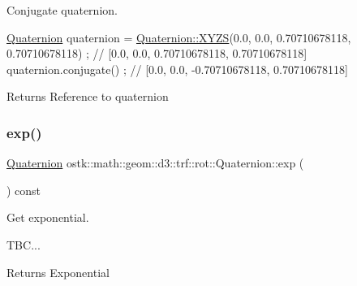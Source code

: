 Conjugate quaternion. 


\begin{DoxyCode}
\hyperlink{classostk_1_1math_1_1geom_1_1d3_1_1trf_1_1rot_1_1_quaternion_ad9fd7d8eb5effb4d4e0394bbb5bb86dc}{Quaternion} quaternion = \hyperlink{classostk_1_1math_1_1geom_1_1d3_1_1trf_1_1rot_1_1_quaternion_ac57ea57a4033622ed1389101b2e58c76}{Quaternion::XYZS}(0.0, 0.0, 0.70710678118, 0.70710678118) 
      ; \textcolor{comment}{// [0.0, 0.0, 0.70710678118, 0.70710678118]}
quaternion.conjugate() ; \textcolor{comment}{// [0.0, 0.0, -0.70710678118, 0.70710678118]}
\end{DoxyCode}


\begin{DoxyReturn}{Returns}
Reference to quaternion 
\end{DoxyReturn}
\mbox{\label{classostk_1_1math_1_1geom_1_1d3_1_1trf_1_1rot_1_1_quaternion_ab52abec08a04aa42646b2f418b7ba964}} 
\subsubsection{\texorpdfstring{exp()}{exp()}}
{\footnotesize\ttfamily \hyperlink{classostk_1_1math_1_1geom_1_1d3_1_1trf_1_1rot_1_1_quaternion}{Quaternion} ostk\+::math\+::geom\+::d3\+::trf\+::rot\+::\+Quaternion\+::exp (\begin{DoxyParamCaption}{ }\end{DoxyParamCaption}) const}



Get exponential. 


\begin{DoxyCode}
TBC...
\end{DoxyCode}


\begin{DoxyReturn}{Returns}
Exponential 
\end{DoxyReturn}
\mbox{\label{classostk_1_1math_1_1geom_1_1d3_1_1trf_1_1rot_1_1_quaternion_a6cb0e23d41afd8477e97fa764d416e1e}} 
